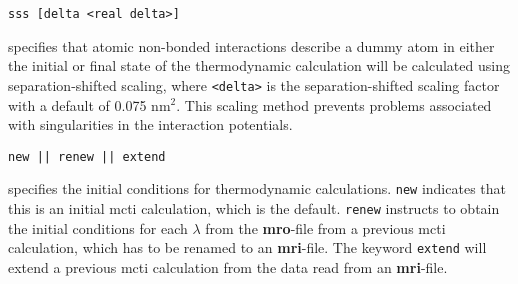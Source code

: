 \begin{description}
\item
\begin{verbatim}
sss [delta <real delta>]
\end{verbatim}
specifies that atomic non-bonded interactions describe a dummy atom
in either the initial or final state of the thermodynamic calculation
will be calculated using separation-shifted scaling, where \verb+<delta>+ 
is the separation-shifted scaling factor with a default of 0.075 nm$^2$.
This scaling method prevents problems associated with singularities in
the interaction potentials.

\item
\begin{verbatim}
new || renew || extend
\end{verbatim}
specifies the initial conditions for thermodynamic calculations.
{\tt new} indicates that this is an initial mcti calculation, which
is the default. {\tt renew} instructs to obtain the initial
conditions for each $\lambda$ from the {\bf mro}-file from a previous 
mcti calculation, which has to be renamed to an {\bf mri}-file. The
keyword {\tt extend} will extend a previous mcti calculation from the
data read from an {\bf mri}-file.
\end{description}

